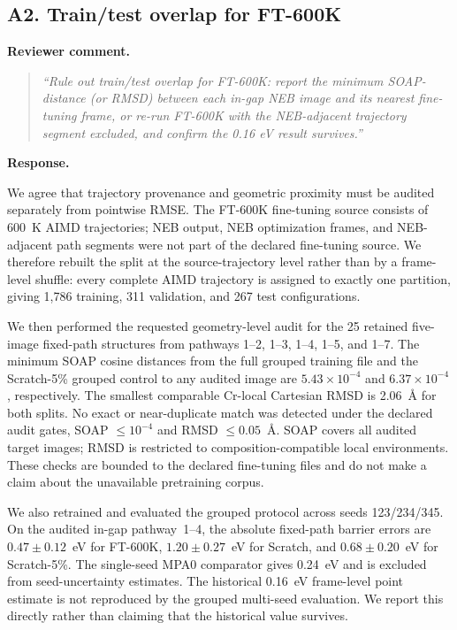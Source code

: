 \subsection*{A2. Train/test overlap for FT-600K}

\noindent\textbf{Reviewer comment.}
\begin{quote}
\itshape
``Rule out train/test overlap for FT-600K: report the minimum SOAP-distance (or RMSD) between each in-gap NEB image and its nearest fine-tuning frame, or re-run FT-600K with the NEB-adjacent trajectory segment excluded, and confirm the 0.16 eV result survives.''
\end{quote}

\noindent\textbf{Response.}

We agree that trajectory provenance and geometric proximity must be audited separately from pointwise RMSE. The FT-600K fine-tuning source consists of 600~K AIMD trajectories; NEB output, NEB optimization frames, and NEB-adjacent path segments were not part of the declared fine-tuning source. We therefore rebuilt the split at the source-trajectory level rather than by a frame-level shuffle: every complete AIMD trajectory is assigned to exactly one partition, giving 1,786 training, 311 validation, and 267 test configurations.

We then performed the requested geometry-level audit for the 25 retained five-image fixed-path structures from pathways 1--2, 1--3, 1--4, 1--5, and 1--7. The minimum SOAP cosine distances from the full grouped training file and the Scratch-5\% grouped control to any audited image are $5.43\times10^{-4}$ and $6.37\times10^{-4}$, respectively. The smallest comparable Cr-local Cartesian RMSD is 2.06~\AA{} for both splits. No exact or near-duplicate match was detected under the declared audit gates, SOAP $\leq10^{-4}$ and RMSD $\leq0.05$~\AA{}. SOAP covers all audited target images; RMSD is restricted to composition-compatible local environments. These checks are bounded to the declared fine-tuning files and do not make a claim about the unavailable pretraining corpus.

We also retrained and evaluated the grouped protocol across seeds 123/234/345. On the audited in-gap pathway~1--4, the absolute fixed-path barrier errors are $0.47\pm0.12$~eV for FT-600K, $1.20\pm0.27$~eV for Scratch, and $0.68\pm0.20$~eV for Scratch-5\%. The single-seed MPA0 comparator gives 0.24~eV and is excluded from seed-uncertainty estimates. The historical 0.16~eV frame-level point estimate is not reproduced by the grouped multi-seed evaluation. We report this directly rather than claiming that the historical value survives.

